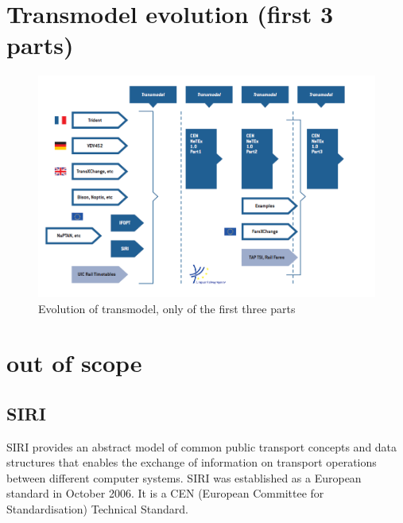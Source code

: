 \begin{appendices}
\section*{Transmodel evolution (first 3 parts)}
\begin{figure}[H]
    \centering
    \includegraphics[width=\textwidth]{images/trans.png}
    \caption{Evolution of transmodel, only of the first three parts}
    \label{fig:evolution:transmodel}
\end{figure}
\section*{out of scope}
\subsection*{SIRI}
SIRI provides an abstract model of common public transport concepts and data structures that enables the exchange of information on transport operations between different computer systems. SIRI was established as a European standard in October 2006. It is a CEN (European Committee for Standardisation) Technical Standard.



\end{appendices}